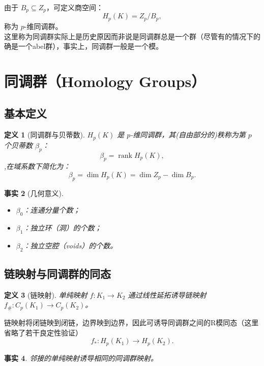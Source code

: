 \documentclass[UTF8]{ctexart}
\newtheorem{definition}{定义}[section]
\newtheorem{fact}[definition]{事实}
\begin{document}
由于 \(B_p \subseteq Z_p\)，可定义商空间：
\[
H_p(K) = Z_p / B_p,
\]
称为 \(p\)-维同调群。\\
这里称为同调群实际上是历史原因而非说是同调群总是一个群（尽管有的情况下的确是一个abel群），事实上，同调群一般是一个模。

\section{同调群（Homology Groups）}
\label{sec:homology-groups}

\subsection{基本定义}
\label{subsec:homology-basics}

\begin{definition}[同调群与贝蒂数]
\label{def:betti-number}
\(H_p(K)\) 是 \(p\)-维同调群，其(自由部分的)秩称为第 \(p\) 个贝蒂数 \(\beta_p\)：
\[
\beta_p = \operatorname{rank} H_p(K),
\],在域系数下简化为：
\[
\beta_p = \dim H_p(K) = \dim Z_p - \dim B_p.
\]
\end{definition}

\begin{fact}[几何意义]
\label{fact:betti-geometric}
\begin{itemize}
    \item \(\beta_0\)：连通分量个数；
    \item \(\beta_1\)：独立环（洞）的个数；
    \item \(\beta_2\)：独立空腔（voids）的个数。
\end{itemize}
\end{fact}

\subsection{链映射与同调群的同态}
\label{subsec:chain-map}

\begin{definition}[链映射]
\label{def:chain-map}
单纯映射 \(f: K_1 \to K_2\) 通过线性延拓诱导链映射 \(f_\#: C_p(K_1) \to C_p(K_2)\)。
\end{definition}

链映射将闭链映到闭链，边界映到边界，因此可诱导同调群之间的R模同态（这里省略了若干良定性验证）
\[
f_*: H_p(K_1) \to H_p(K_2).
\]

\begin{fact}
\label{fact:contiguous-induced}
邻接的单纯映射诱导相同的同调群映射。
\end{fact}
\end{document}
